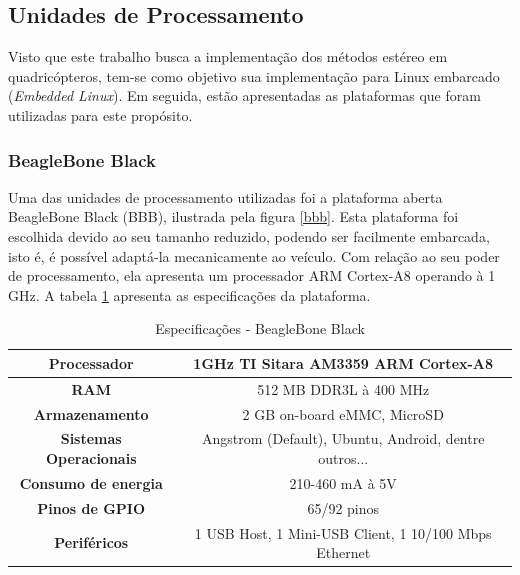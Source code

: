 \subsection{Unidades de Processamento}

Visto que este trabalho busca a implementação dos métodos estéreo em quadricópteros, tem-se como objetivo sua implementação para Linux embarcado (\textit{Embedded Linux}). Em seguida, estão apresentadas as plataformas que foram utilizadas para este propósito.


\subsubsection{BeagleBone Black}

Uma das unidades de processamento utilizadas foi a plataforma aberta BeagleBone Black (BBB), ilustrada pela figura \ref{bbb}. Esta plataforma foi escolhida devido ao seu tamanho reduzido, podendo ser facilmente embarcada, isto é, é possível adaptá-la mecanicamente ao veículo. Com relação ao seu poder de processamento, ela apresenta um processador ARM Cortex-A8 operando à 1 GHz. A tabela \ref{bbb_tab} apresenta as especificações da plataforma.

\begin{table}[]
\centering
\caption{Especificações - BeagleBone Black}
\label{bbb_tab}
\begin{tabular}{|c|c|}
\hline
\textbf{Processador}           & 1GHz TI Sitara AM3359 ARM Cortex-A8			\\	\hline
\textbf{RAM}                   & 512 MB DDR3L à 400 MHz					\\	\hline
\textbf{Armazenamento}         & 2 GB on-board eMMC, MicroSD				\\	\hline
\textbf{Sistemas Operacionais} & Angstrom (Default), Ubuntu, Android, dentre outros...	\\	\hline
\textbf{Consumo de energia}    & 210-460 mA à 5V					\\	\hline
\textbf{Pinos de GPIO}         & 65/92 pinos						\\	\hline
\textbf{Periféricos}           & 1 USB Host, 1 Mini-USB Client, 1 10/100 Mbps Ethernet  \\	\hline                              
\end{tabular}
\end{table}

